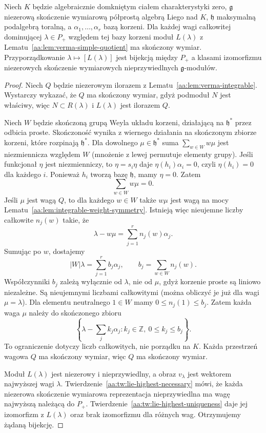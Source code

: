 \begin{twierdzenie}
\label{aa:tw:lie-highest-classification}
Niech $K$ będzie algebraicznie domkniętym ciałem charakterystyki zero, $\mathfrak g$ niezerową skończenie wymiarową półprostą algebrą Liego nad $K$, $\mathfrak h$ maksymalną podalgebrą toralną, a $\alpha_1,\ldots,\alpha_r$ bazą korzeni. Dla każdej wagi całkowitej dominującej $\lambda\in P_+$ względem tej bazy korzeni moduł $L(\lambda)$ z Lematu~\ref{aa:lem:verma-simple-quotient} ma skończony wymiar. Przyporządkowanie $\lambda\mapsto[L(\lambda)]$ jest bijekcją między $P_+$ a klasami izomorfizmu niezerowych skończenie wymiarowych nieprzywiedlnych $\mathfrak g$-modułów.
\end{twierdzenie}
\begin{proof}
Niech $Q$ będzie niezerowym ilorazem z Lematu~\ref{aa:lem:verma-integrable}. Wystarczy wykazać, że $Q$ ma skończony wymiar, gdyż podmoduł $N$ jest właściwy, więc $N\subset R(\lambda)$ i $L(\lambda)$ jest ilorazem $Q$.

Niech $W$ będzie skończoną grupą Weyla układu korzeni, działającą na $\mathfrak h^*$ przez odbicia proste. Skończoność wynika z wiernego działania na skończonym zbiorze korzeni, które rozpinają $\mathfrak h^*$. Dla dowolnego $\mu\in\mathfrak h^*$ suma $\sum_{w\in W}w\mu$ jest niezmiennicza względem $W$ (mnożenie z lewej permutuje elementy grupy). Jeśli funkcjonał $\eta$ jest niezmienniczy, to $\eta=s_i\eta$ daje $\eta(h_i)\alpha_i=0$, czyli $\eta(h_i)=0$ dla każdego $i$. Ponieważ $h_i$ tworzą bazę $\mathfrak h$, mamy $\eta=0$. Zatem
\[
 \sum_{w\in W}w\mu=0.
\]
Jeśli $\mu$ jest wagą $Q$, to dla każdego $w\in W$ także $w\mu$ jest wagą na mocy Lematu~\ref{aa:lem:integrable-weight-symmetry}. Istnieją więc nieujemne liczby całkowite $n_j(w)$ takie, że
\[
 \lambda-w\mu=\sum_{j=1}^r n_j(w)\alpha_j.
\]
Sumując po $w$, dostajemy
\[
 |W|\lambda=\sum_{j=1}^r b_j\alpha_j,
 \qquad b_j=\sum_{w\in W}n_j(w).
\]
Współczynniki $b_j$ zależą wyłącznie od $\lambda$, nie od $\mu$, gdyż korzenie proste są liniowo niezależne. Są nieujemnymi liczbami całkowitymi (można obliczyć je już dla wagi $\mu=\lambda$). Dla elementu neutralnego $1\in W$ mamy $0\le n_j(1)\le b_j$. Zatem każda waga $\mu$ należy do skończonego zbioru
\[
 \left\{\lambda-\sum_j k_j\alpha_j:
 k_j\in\mathbb Z,\ 0\le k_j\le b_j\right\}.
\]
To ograniczenie dotyczy liczb całkowitych, nie porządku na $K$. Każda przestrzeń wagowa $Q$ ma skończony wymiar, więc $Q$ ma skończony wymiar.

Moduł $L(\lambda)$ jest niezerowy i nieprzywiedlny, a obraz $v_\lambda$ jest wektorem najwyższej wagi $\lambda$. Twierdzenie~\ref{aa:tw:lie-highest-necessary} mówi, że każda niezerowa skończenie wymiarowa reprezentacja nieprzywiedlna ma wagę najwyższą należącą do $P_+$. Twierdzenie~\ref{aa:tw:lie-highest-uniqueness} daje jej izomorfizm z $L(\lambda)$ oraz brak izomorfizmu dla różnych wag. Otrzymujemy żądaną bijekcję.
\end{proof}

